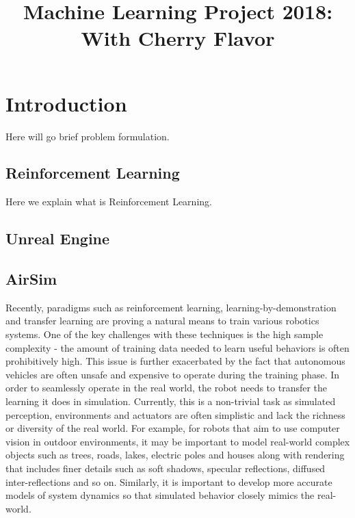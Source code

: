 \documentclass{article}
\begin{document}
\title{Machine Learning Project 2018: With Cherry Flavor}
\maketitle

\section{Introduction}

\cite{cad2rl}


Here will go  brief problem formulation.

\subsection{Reinforcement Learning}

Here we explain what is Reinforcement Learning.

\subsection{Unreal Engine}

\subsection{AirSim}

Recently, paradigms such as reinforcement learning, learning-by-demonstration
and transfer learning are proving a natural means to train various robotics
systems. One of the key challenges with these techniques is the high sample 
complexity - the amount of training data needed to learn useful behaviors is often 
prohibitively high. This issue is further exacerbated by the fact that autonomous 
vehicles are often unsafe and expensive to operate during the training phase. In order to
seamlessly operate in the real world, the robot needs to transfer the learning it does
in simulation. Currently, this is a non-trivial task as simulated perception, environments 
and actuators are often simplistic and lack the richness or diversity of the
real world. For example, for robots that aim to use computer vision in outdoor 
environments, it may be important to model real-world complex objects such as trees,
roads, lakes, electric poles and houses along with rendering that includes finer 
details such as soft shadows, specular reflections, diffused inter-reflections and so on.
Similarly, it is important to develop more accurate models of system dynamics so
that simulated behavior closely mimics the real-world.
\end{document}
